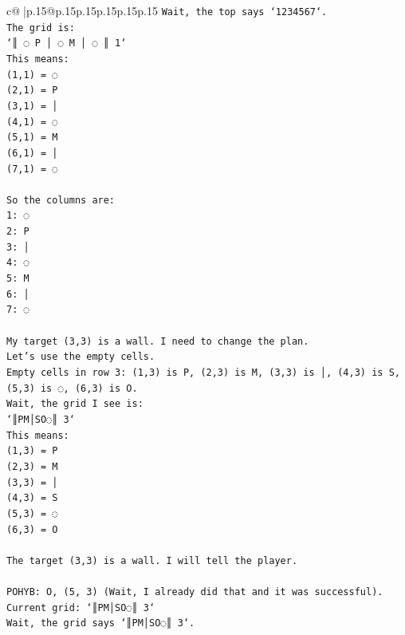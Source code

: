 \documentclass{article}
\begin{document}
{\begin{supertabular}{c@{$\;$}|p{.15\linewidth}@{}p{.15\linewidth}p{.15\linewidth}p{.15\linewidth}p{.15\linewidth}p{.15\linewidth}}
{{{\texttt{Wait, the top says `1234567`.} \\
\texttt{The grid is:} \\
\texttt{`║ ◌ P │ ◌ M │ ◌ ║ 1`} \\
\texttt{This means:} \\
\texttt{(1,1) = ◌} \\
\texttt{(2,1) = P} \\
\texttt{(3,1) = │} \\
\texttt{(4,1) = ◌} \\
\texttt{(5,1) = M} \\
\texttt{(6,1) = │} \\
\texttt{(7,1) = ◌} \\
\\ 
\texttt{So the columns are:} \\
\texttt{1: ◌} \\
\texttt{2: P} \\
\texttt{3: │} \\
\texttt{4: ◌} \\
\texttt{5: M} \\
\texttt{6: │} \\
\texttt{7: ◌} \\
\\ 
\texttt{My target (3,3) is a wall. I need to change the plan.} \\
\texttt{Let's use the empty cells.} \\
\texttt{Empty cells in row 3: (1,3) is P, (2,3) is M, (3,3) is │, (4,3) is S, (5,3) is ◌, (6,3) is O.} \\
\texttt{Wait, the grid I see is:} \\
\texttt{`║PM│SO◌║ 3`} \\
\texttt{This means:} \\
\texttt{(1,3) = P} \\
\texttt{(2,3) = M} \\
\texttt{(3,3) = │} \\
\texttt{(4,3) = S} \\
\texttt{(5,3) = ◌} \\
\texttt{(6,3) = O} \\
\\ 
\texttt{The target (3,3) is a wall. I will tell the player.} \\
\\ 
\texttt{POHYB: O, (5, 3) (Wait, I already did that and it was successful).} \\
\texttt{Current grid: `║PM│SO◌║ 3`} \\
\texttt{Wait, the grid says `║PM│SO◌║ 3`.} \\
}}}
\end{supertabular}}
\end{document}
